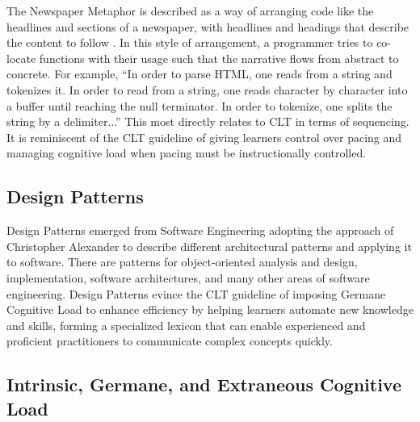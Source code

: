 The Newspaper Metaphor is described as a way of arranging code like the headlines and sections of a newspaper, with headlines and headings that describe the content to follow \cite{Martin2016}. In this style of arrangement, a programmer tries to co-locate functions with their usage such that the narrative flows from abstract to concrete. For example, “In order to parse HTML, one reads from a string and tokenizes it. In order to read from a string, one reads character by character into a buffer until reaching the null terminator. In order to tokenize, one splits the string by a delimiter...” This most directly relates to CLT in terms of sequencing. It is reminiscent of the CLT guideline of giving learners control over pacing and managing cognitive load when pacing must be instructionally controlled.

\subsection{Design Patterns}

Design Patterns emerged from Software Engineering adopting the approach of Christopher Alexander \cite{Alexander1979} to describe different architectural patterns and applying it to software. There are patterns for object-oriented analysis and design, implementation, software architectures, and many other areas of software engineering. Design Patterns evince the CLT guideline of imposing Germane Cognitive Load to enhance efficiency by helping learners automate new knowledge and skills, forming a specialized lexicon that can  enable experienced and proficient practitioners to communicate complex concepts quickly.

\subsection{Intrinsic, Germane, and Extraneous Cognitive Load}

